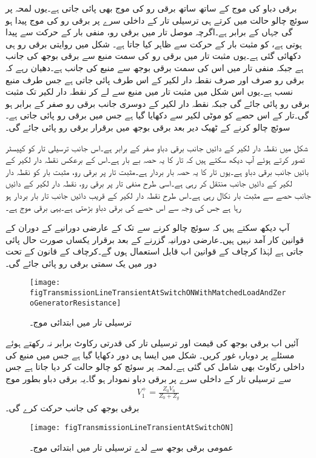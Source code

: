 برقی دباو کی موج کے ساتھ ساتھ برقی رو کی موج بھی پائی جاتی ہے۔یوں لمحہ  پر سوئچ چالو حالت میں کرتے ہی ترسیلی تار کے داخلی سرے پر  برقی رو کی موج پیدا ہو گی جہاں  کے برابر ہے۔اگرچہ موصل تار میں برقی رو، منفی بار کے حرکت سے پیدا ہوتی ہے،  کو مثبت بار کے حرکت سے ظاہر کیا جاتا ہے۔ شکل  میں روایتی برقی رو ہی دکھائی گئی ہے۔یوں مثبت تار میں برقی رو کی سمت منبع سے برقی بوجھ کی جانب ہے جبکہ منفی تار میں اس کی سمت برقی بوجھ سے منبع کی جانب ہے۔دھیان رہے کہ برقی رو صرف اور صرف نقطہ دار لکیر کے اس طرف پائی جاتی ہے جس طرف منبع نسب ہے۔یوں اس شکل میں مثبت تار میں منبع سے لے کر نقطہ دار لکیر تک مثبت برقی رو پائی جائے گی جبکہ نقطہ دار لکیر کے دوسری جانب برقی رو صفر کے برابر ہو گی۔تار کے اس حصے کو موٹی لکیر سے دکھایا گیا ہے جس میں برقی رو پائی جاتی ہے۔سوئچ چالو کرنے کے ٹھیک  دیر بعد برقی بوجھ میں برقرار  برقی رو  پائی جائے گی۔

شکل  میں نقطہ دار لکیر کے دائیں جانب برقی دباو صفر کے برابر ہے۔اس جانب ترسیلی تار کو کپیسٹر تصور کرتے ہوئے آپ دیکھ سکتے ہیں کہ تار کا یہ حصہ بے بار  ہے۔اس کے برعکس نقطہ دار لکیر کے بائیں جانب برقی دباو  ہے۔یوں تار کا یہ حصہ بار بردار ہے۔مثبت تار پر برقی رو، مثبت بار کو نقطہ دار لکیر کے دائیں جانب منتقل کر رہی ہے۔اسی طرح منفی تار پر برقی رو، نقطہ دار لکیر کے دائیں جانب حصے سے مثبت بار نکال رہی ہے۔اس طرح نقطہ دار لکیر کے قریب دائیں جانب تار بار بردار ہو رہا ہے جس کی وجہ سے اس حصے کی برقی دباو بڑھتی ہے۔یہی برقی موج ہے۔

آپ دیکھ سکتے ہیں کہ  سوئچ چالو کرنے سے  تک کے عارضی دورانیے کے دوران  کے قوانین کار آمد نہیں ہیں۔عارضی دورانیہ گزرنے کے بعد برقرار یکساں صورت حال پائی جاتی ہے لہٰذا کرچاف کے قوانین اب قابل استعمال ہوں گے۔کرچاف کے قانون کے تحت دور میں یک سمتی برقی رو  پائی جائے گی۔
\begin{figure}
\centering
\texttt{[image: figTransmissionLineTransientAtSwitchONWithMatchedLoadAndZeroGeneratorResistance]}
\caption{ترسیلی تار میں ابتدائی موج۔}
\label{شکل_ترسیلی_ابتدائی_موج}
\end{figure}

آئیں اب برقی بوجھ کی قیمت اور ترسیلی تار کی قدرتی رکاوٹ برابر نہ رکھتے ہوئے مسئلے پر دوبارہ غور کریں۔ شکل  میں ایسا ہی دور دکھایا گیا ہے جس میں منبع کی داخلی رکاوٹ بھی شامل کی گئی ہے۔لمحہ  پر سوئچ کو چالو حالت کر دیا جاتا ہے جس سے ترسیلی تار کے داخلی سرے پر  برقی دباو نمودار ہو گا۔یہ برقی دباو بطور موج  
\begin{align}\label{مساوات_ترسیلی_عارضی_پہلی}
V_1^+=\frac{Z_0 V_0}{Z_0+Z_g}
\end{align}
برقی بوجھ کی جانب حرکت کرے گی۔
\begin{figure}
\centering
\texttt{[image: figTransmissionLineTransientAtSwitchON]}
\caption{عمومی برقی بوجھ سے لدے ترسیلی تار میں ابتدائی موج۔}
\label{شکل_ترسیلی_عمومی_بار_ابتدائی_موج}
\end{figure}

